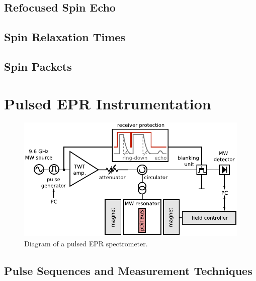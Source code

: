 \subsection{Refocused Spin Echo}
\subsection{Spin Relaxation Times}
\subsection{Spin Packets}

\section{Pulsed EPR Instrumentation}

\begin{figure}[h]
\center
	\includegraphics[width=1\textwidth]{./pulse/figures/pEPR_spectrometer_diagram.pdf}
	\caption{Diagram of a pulsed EPR spectrometer.}
	\label{fig:pepr_spectrometer_diagram}
\end{figure}

\subsection{Pulse Sequences and Measurement Techniques}
